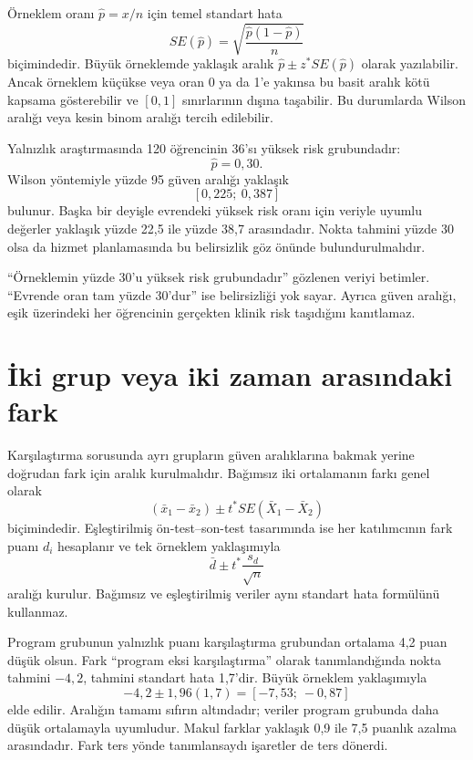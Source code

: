 Örneklem oranı $\hat p=x/n$ için temel standart hata
\[
SE(\hat p)=\sqrt{\frac{\hat p(1-\hat p)}{n}}
\]
biçimindedir. Büyük örneklemde yaklaşık aralık $\hat p\pm z^*SE(\hat p)$
olarak yazılabilir. Ancak örneklem küçükse veya oran 0 ya da 1'e yakınsa bu
basit aralık kötü kapsama gösterebilir ve $[0,1]$ sınırlarının dışına taşabilir.
Bu durumlarda Wilson aralığı veya kesin binom aralığı tercih edilebilir.

Yalnızlık araştırmasında 120 öğrencinin 36'sı yüksek risk grubundadır:
\[
\hat p=0{,}30.
\]
Wilson yöntemiyle yüzde 95 güven aralığı yaklaşık
\[
[0{,}225;\ 0{,}387]
\]
bulunur. Başka bir deyişle evrendeki yüksek risk oranı için veriyle uyumlu
değerler yaklaşık yüzde 22,5 ile yüzde 38,7 arasındadır. Nokta tahmini yüzde
30 olsa da hizmet planlamasında bu belirsizlik göz önünde bulundurulmalıdır.

\begin{mistakebox}
``Örneklemin yüzde 30'u yüksek risk grubundadır'' gözlenen veriyi betimler.
``Evrende oran tam yüzde 30'dur'' ise belirsizliği yok sayar. Ayrıca güven
aralığı, eşik üzerindeki her öğrencinin gerçekten klinik risk taşıdığını
kanıtlamaz.
\end{mistakebox}

\section{İki grup veya iki zaman arasındaki fark}

Karşılaştırma sorusunda ayrı grupların güven aralıklarına bakmak yerine
doğrudan fark için aralık kurulmalıdır. Bağımsız iki ortalamanın farkı genel
olarak
\[
(\bar x_1-\bar x_2)\pm t^*SE(\bar X_1-\bar X_2)
\]
biçimindedir. Eşleştirilmiş ön-test--son-test tasarımında ise her katılımcının
fark puanı $d_i$ hesaplanır ve tek örneklem yaklaşımıyla
\[
\bar d\pm t^*\frac{s_d}{\sqrt n}
\]
aralığı kurulur. Bağımsız ve eşleştirilmiş veriler aynı standart hata
formülünü kullanmaz.

\begin{ornek}
Program grubunun yalnızlık puanı karşılaştırma grubundan ortalama 4,2 puan
düşük olsun. Fark ``program eksi karşılaştırma'' olarak tanımlandığında nokta
tahmini $-4{,}2$, tahmini standart hata 1,7'dir. Büyük örneklem yaklaşımıyla
\[
-4{,}2\pm1{,}96(1{,}7)=[-7{,}53;\ -0{,}87]
\]
elde edilir. Aralığın tamamı sıfırın altındadır; veriler program grubunda daha
düşük ortalamayla uyumludur. Makul farklar yaklaşık 0,9 ile 7,5 puanlık azalma
arasındadır. Fark ters yönde tanımlansaydı işaretler de ters dönerdi.
\end{ornek}

